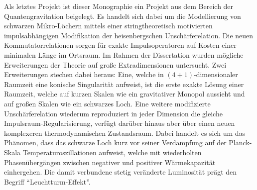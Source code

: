 \documentclass[a4paper,12pt]{article}
\begin{document}
Als letztes Projekt ist dieser Monographie ein Projekt aus dem
Bereich der Quantengravitation beigelegt. Es handelt sich dabei um die
Modellierung von schwarzen Mikro-Löchern mittels einer stringtheoretisch
motivierten impulsabhängigen Modifikation der heisenbergschen
Unschärferelation. Die neuen
Kommutatorrelationen sorgen für exakte Impulsoperatoren auf Kosten einer
minimalen Länge im Ortsraum.
Im Rahmen der Dissertation wurden mögliche Erweiterungen der Theorie 
auf große Extradimensionen untersucht. 
Zwei Erweiterungen stechen dabei heraus: Eine, welche in
$(4+1)$-dimensionaler Raumzeit eine konische Singularität aufweist, ist
die erste exakte Lösung einer Raumzeit, welche auf kurzen Skalen wie ein
gravitativer Monopol aussieht und auf großen Skalen wie ein schwarzes Loch.
%
Eine weitere modifizierte Unschärferelation wiederum reproduziert in
jeder Dimension die gleiche Impulsraum-Regularisierung, verfügt darüber
hinaus aber über einen neuen komplexeren thermodynamischen Zustandsraum.
Dabei handelt es sich um das Phänomen, dass das schwarze Loch kurz vor seiner
Verdampfung auf der Planck-Skala Temperaturoszillationen aufweist,
welche mit wiederholten Phasenübergängen zwischen negativer und positiver
Wärmekapazität einhergehen. Die damit verbundene stetig veränderte
Luminosität prägt den Begriff ``Leuchtturm-Effekt''.



	
\end{document}
